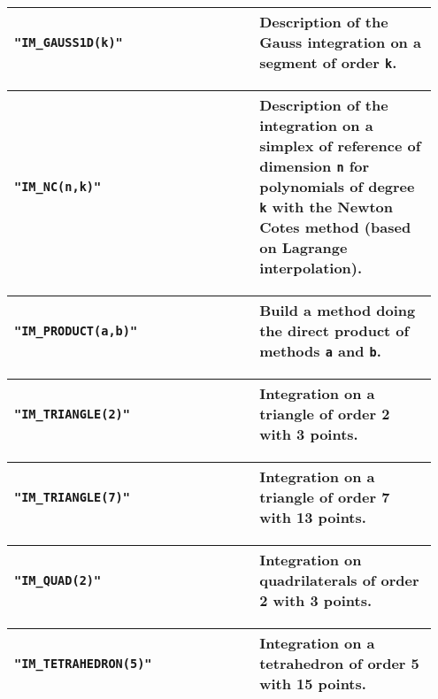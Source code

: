 \begin{center} \begin{tabular}{|m{0.55\linewidth}|m{0.4\linewidth}|} \hline
{\tt "IM_GAUSS1D(k)" } & Description of the Gauss integration on a segment of order {\tt k}. \\ \hline
\end{tabular}  
\begin{tabular}{|m{0.55\linewidth}|m{0.4\linewidth}|} \hline
{\tt "IM_NC(n,k)"} & Description of the integration on a simplex of reference of dimension {\tt n} for polynomials of degree {\tt k} with the Newton Cotes method (based on Lagrange interpolation).\\ \hline
\end{tabular}  
\begin{tabular}{|m{0.55\linewidth}|m{0.4\linewidth}|} \hline
{\tt "IM_PRODUCT(a,b)"} & Build a method doing the direct product of methods {\tt a} and {\tt b}. \\ \hline
\end{tabular}  
\begin{tabular}{|m{0.55\linewidth}|m{0.4\linewidth}|} \hline
{\tt "IM_TRIANGLE(2)"} & Integration on a triangle of order 2 with 3 points. \\ \hline
\end{tabular}
\begin{tabular}{|m{0.55\linewidth}|m{0.4\linewidth}|} \hline
{\tt "IM_TRIANGLE(7)"} & Integration on a triangle of order 7 with 13 points. \\ \hline
\end{tabular} 
\begin{tabular}{|m{0.55\linewidth}|m{0.4\linewidth}|} \hline
{\tt "IM_QUAD(2)"} & Integration on quadrilaterals of order 2 with 3 points. \\ \hline
\end{tabular}
\begin{tabular}{|m{0.55\linewidth}|m{0.4\linewidth}|} \hline
{\tt "IM_TETRAHEDRON(5)"} & Integration on a tetrahedron of order 5 with 15 points. \\ \hline
\end{tabular} \end{center}
